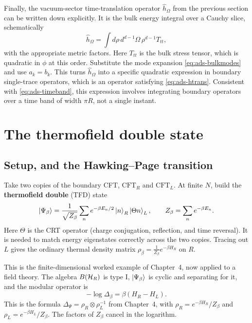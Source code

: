 Finally, the vacuum-sector time-translation operator $\hat h_\Omega$ from the previous section can be written
down explicitly. It is the bulk energy integral over a Cauchy slice, schematically
\[
\hat h_\Omega=\int d\rho\,d^{d-1}\Omega\,\rho^{d-1} T_{tt} ,
\]
with the appropriate metric factors. Here $T_{tt}$ is the bulk stress tensor, which is quadratic in $\phi$ at
this order. Substitute the mode expansion \eqref{eq:ads-bulkmodes} and use $a_k=b_k$. This turns $\hat h_\Omega$
into a specific quadratic expression in boundary single-trace operators, which is an operator satisfying
\eqref{eq:ads-htrans}. Consistent with \eqref{eq:ads-timeband}, this expression involves integrating boundary
operators over a time band of width $\pi R$, not a single instant.

\section{The thermofield double state}

\subsection*{Setup, and the Hawking--Page transition}

Take two copies of the boundary CFT, $\text{CFT}_R$ and $\text{CFT}_L$. At finite $N$, build the
\textbf{thermofield double} (TFD) state
\begin{equation}
\ket{\Psi_\beta} = \frac{1}{\sqrt{Z_\beta}}\sum_n e^{-\beta E_n/2}\ket n_R\ket{\Theta n}_L, \qquad
Z_\beta=\sum_n e^{-\beta E_n} .
\label{eq:ads-tfd}
\end{equation}
Here $\Theta$ is the CRT operator (charge conjugation, reflection, and time reversal). It is needed to match
energy eigenstates correctly across the two copies. Tracing out $L$ gives the ordinary thermal density matrix
$\rho_\beta=\tfrac1{Z_\beta}e^{-\beta H_R}$ on $R$.

This is the finite-dimensional worked example of Chapter~4, now applied to a field theory. The algebra
$B(\mathcal{H}_R)$ is type I, $\ket{\Psi_\beta}$ is cyclic and separating for it, and the modular operator is
\begin{equation}
-\log\Delta_\beta=\beta(H_R-H_L) .
\label{eq:ads-tfd-modular}
\end{equation}
This is the formula $\Delta_\Psi=\rho_R\otimes\rho_L^{-1}$ from Chapter~4, with $\rho_R=e^{-\beta H_R}/Z_\beta$
and $\rho_L=e^{-\beta H_L}/Z_\beta$. The factors of $Z_\beta$ cancel in the logarithm.

